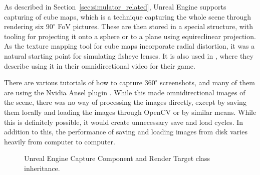 As described in Section~\ref{sec:simulator_related}, Unreal Engine supports capturing of cube maps, which is a technique capturing the whole scene through rendering six $90^\circ$ FoV pictures. These are then stored in a special structure, with tooling for projecting it onto a sphere or to a plane using equireclinear projection. As the texture mapping tool for cube maps incorporate radial distortion, it was a natural starting point for simulating fisheye lenses. It is also used in \cite{UnrealCubeCapture}, where they describe using it in their omnidirectional video for their game.

There are various tutorials of how to capture $360^\circ$ screenshots, and many of them are using the Nvidia Ansel plugin \cite{SceenshotsAnsel}. While this made omnidirectional images of the scene, there was no way of processing the images directly, except by saving them locally and loading the images through OpenCV or by similar means. While this is definitely possible, it would create unnecessary save and load cycles. In addition to this, the performance of saving and loading images from disk varies heavily from computer to computer.

\begin{figure}[!htb]
    \centering
    \caption{Unreal Engine Capture Component and Render Target class inheritance.}
    \label{fig:capture_render_inherit}
\end{figure}

